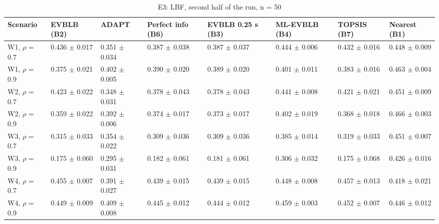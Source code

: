 \begin{table}[t]
\centering
\footnotesize
\caption{E3: LBF, second half of the run, n = 50}
\label{tab:e3_lbf}
\begin{tabular}{llllllll}
\toprule
Scenario & EVBLB (B2) & ADAPT & Perfect info (B6) & EVBLB 0.25 s (B3) & ML-EVBLB (B4) & TOPSIS (B7) & Nearest (B1) \\
\midrule
W1, $\rho$ = 0.7 & 0.436 $\pm$ 0.017 & 0.351 $\pm$ 0.034 & 0.387 $\pm$ 0.038 & 0.387 $\pm$ 0.037 & 0.444 $\pm$ 0.006 & 0.432 $\pm$ 0.016 & 0.448 $\pm$ 0.009 \\
W1, $\rho$ = 0.9 & 0.375 $\pm$ 0.021 & 0.402 $\pm$ 0.005 & 0.390 $\pm$ 0.020 & 0.389 $\pm$ 0.020 & 0.401 $\pm$ 0.011 & 0.383 $\pm$ 0.016 & 0.463 $\pm$ 0.004 \\
W2, $\rho$ = 0.7 & 0.423 $\pm$ 0.022 & 0.348 $\pm$ 0.031 & 0.378 $\pm$ 0.043 & 0.378 $\pm$ 0.043 & 0.441 $\pm$ 0.008 & 0.421 $\pm$ 0.021 & 0.451 $\pm$ 0.009 \\
W2, $\rho$ = 0.9 & 0.359 $\pm$ 0.022 & 0.392 $\pm$ 0.006 & 0.374 $\pm$ 0.017 & 0.373 $\pm$ 0.017 & 0.402 $\pm$ 0.019 & 0.368 $\pm$ 0.018 & 0.466 $\pm$ 0.003 \\
W3, $\rho$ = 0.7 & 0.315 $\pm$ 0.033 & 0.354 $\pm$ 0.022 & 0.309 $\pm$ 0.036 & 0.309 $\pm$ 0.036 & 0.385 $\pm$ 0.014 & 0.319 $\pm$ 0.033 & 0.451 $\pm$ 0.007 \\
W3, $\rho$ = 0.9 & 0.175 $\pm$ 0.060 & 0.295 $\pm$ 0.031 & 0.182 $\pm$ 0.061 & 0.181 $\pm$ 0.061 & 0.306 $\pm$ 0.032 & 0.175 $\pm$ 0.068 & 0.426 $\pm$ 0.016 \\
W4, $\rho$ = 0.7 & 0.455 $\pm$ 0.007 & 0.391 $\pm$ 0.027 & 0.439 $\pm$ 0.015 & 0.439 $\pm$ 0.015 & 0.448 $\pm$ 0.008 & 0.457 $\pm$ 0.013 & 0.418 $\pm$ 0.021 \\
W4, $\rho$ = 0.9 & 0.449 $\pm$ 0.009 & 0.409 $\pm$ 0.008 & 0.445 $\pm$ 0.012 & 0.444 $\pm$ 0.012 & 0.459 $\pm$ 0.003 & 0.452 $\pm$ 0.007 & 0.446 $\pm$ 0.012 \\
\bottomrule
\end{tabular}
\end{table}
